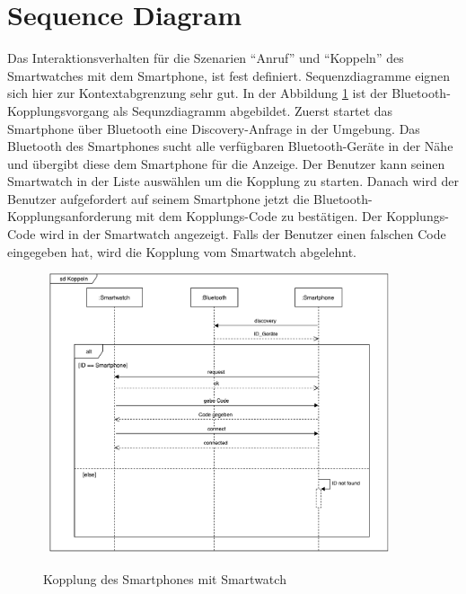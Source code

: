 \section{Sequence Diagram}
Das Interaktionsverhalten für die Szenarien ``Anruf'' und ``Koppeln'' des Smartwatches mit dem Smartphone, ist fest definiert. Sequenzdiagramme eignen sich hier zur Kontextabgrenzung sehr gut.
In der Abbildung \ref{fig:kopplung} ist der Bluetooth-Kopplungsvorgang als Sequnzdiagramm abgebildet.
Zuerst startet das Smartphone über Bluetooth eine Discovery-Anfrage in der Umgebung.
Das Bluetooth des Smartphones sucht alle verfügbaren Bluetooth-Geräte in der Nähe und übergibt diese dem Smartphone für die Anzeige.
Der Benutzer kann seinen Smartwatch in der Liste auswählen um die Kopplung zu starten.
Danach wird der Benutzer aufgefordert auf seinem Smartphone jetzt die Bluetooth-Kopplungsanforderung mit dem Kopplungs-Code zu bestätigen. Der Kopplungs-Code wird in der Smartwatch angezeigt.
Falls der Benutzer einen falschen Code eingegeben hat, wird die Kopplung vom Smartwatch
abgelehnt.

\begin{figure}[H]
\centering\
\includegraphics[width=10cm]{img/KoppelnSequenz}
\caption{Kopplung des Smartphones mit Smartwatch}\label{fig:kopplung}
\end{figure}


